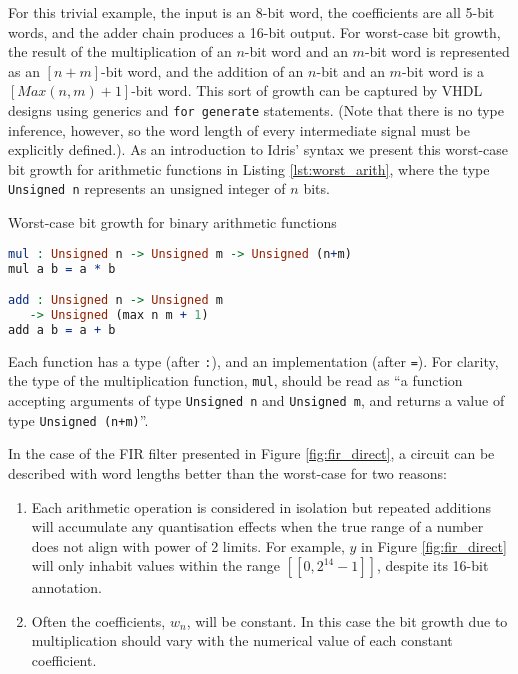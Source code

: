 \documentclass[conference]{IEEEtran}
\begin{document}

For this trivial example, the input is an 8-bit word, the coefficients are all
5-bit words, and the adder chain produces a 16-bit output. For worst-case bit
growth, the result of the multiplication of an $n$-bit word and an $m$-bit word
is represented as an $[n+m]$-bit word, and the addition of an $n$-bit and an
$m$-bit word is a $[Max(n,m)+1]$-bit word. This sort of growth can be captured
by VHDL designs using generics and \texttt{for generate} statements. (Note that
there is no type inference, however, so the word length of every intermediate
signal must be explicitly defined.). As an introduction to Idris' syntax we
present this worst-case bit growth for arithmetic functions in Listing
\ref{lst:worst_arith}, where the type \texttt{Unsigned n} represents an unsigned
integer of $n$ bits.

\begin{codefig}[h]
  \caption{Worst-case bit growth for binary arithmetic functions}
\begin{lstlisting}[language=idris]
mul : Unsigned n -> Unsigned m -> Unsigned (n+m)
mul a b = a * b

add : Unsigned n -> Unsigned m
   -> Unsigned (max n m + 1)
add a b = a + b
\end{lstlisting}
\label{lst:worst_arith}
\end{codefig}

Each function has a type (after \texttt{:}), and an implementation (after \texttt{=}).
For clarity, the type of the multiplication function, \texttt{mul}, should be
read as ``a function accepting arguments of type \texttt{Unsigned n} and
\texttt{Unsigned m}, and returns a value of type \texttt{Unsigned (n+m)}''.

In the case of the FIR filter presented in Figure \ref{fig:fir_direct}, a circuit can be described with word lengths better than the worst-case for two reasons:

\begin{enumerate}
\item Each arithmetic operation is considered in isolation but repeated
  additions will accumulate any quantisation effects when the true range of a
  number does not align with power of 2 limits. For example, $y$ in Figure
  \ref{fig:fir_direct} will only inhabit values within the range
  $[\![0,2^{14}-1]\!]$, despite its 16-bit annotation.
\item Often the coefficients, $w_n$, will be constant. In this case the bit
  growth due to multiplication should vary with the numerical value of each
  constant coefficient.
\end{enumerate}
\end{document}
